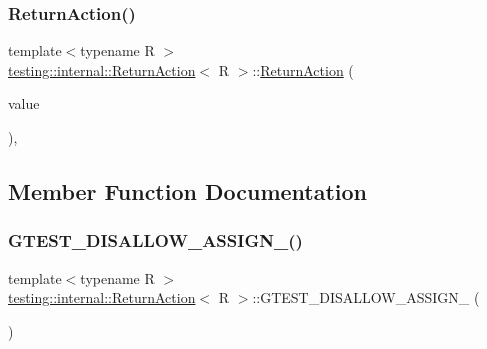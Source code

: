 \subsubsection{\texorpdfstring{ReturnAction()}{ReturnAction()}\hspace{0.1cm}{\footnotesize\ttfamily [3/3]}}
{\footnotesize\ttfamily template$<$typename R $>$ \\
\mbox{\hyperlink{classtesting_1_1internal_1_1_return_action}{testing\+::internal\+::\+Return\+Action}}$<$ R $>$\+::\mbox{\hyperlink{classtesting_1_1internal_1_1_return_action}{Return\+Action}} (\begin{DoxyParamCaption}\item[{R}]{value }\end{DoxyParamCaption})\hspace{0.3cm}{\ttfamily [inline]}, {\ttfamily [explicit]}}



\subsection{Member Function Documentation}
\mbox{\label{classtesting_1_1internal_1_1_return_action_a213aa7089e1caf147a736aa283789045}} 
\subsubsection{\texorpdfstring{GTEST\_DISALLOW\_ASSIGN\_()}{GTEST\_DISALLOW\_ASSIGN\_()}\hspace{0.1cm}{\footnotesize\ttfamily [1/3]}}
{\footnotesize\ttfamily template$<$typename R $>$ \\
\mbox{\hyperlink{classtesting_1_1internal_1_1_return_action}{testing\+::internal\+::\+Return\+Action}}$<$ R $>$\+::G\+T\+E\+S\+T\+\_\+\+D\+I\+S\+A\+L\+L\+O\+W\+\_\+\+A\+S\+S\+I\+G\+N\+\_\+ (\begin{DoxyParamCaption}\item[{\mbox{\hyperlink{classtesting_1_1internal_1_1_return_action}{Return\+Action}}$<$ R $>$}]{ }\end{DoxyParamCaption})\hspace{0.3cm}{\ttfamily [private]}}

